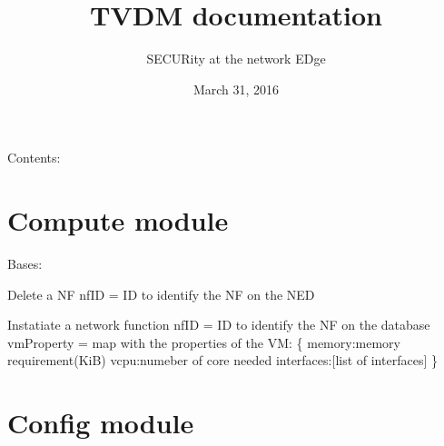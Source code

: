 \documentclass[letterpaper,10pt,oneside]{sphinxmanual}
\title{TVDM documentation}
\date{March 31, 2016}
\author{SECURity at the network EDge}
\begin{document}
\maketitle
\tableofcontents
{}\label{index::doc}


Contents:


\chapter{Compute module}
\label{Compute:welcome-to-tvdm-s-documentation}\label{Compute::doc}\label{Compute:compute-module}\label{Compute:module-Compute}

\begin{fulllineitems}
\label{Compute:Compute.Compute}
Bases: 

\begin{fulllineitems}
\label{Compute:Compute.Compute.deleteNF}
Delete a NF
nfID = ID to identify the NF on the NED

\end{fulllineitems}


\begin{fulllineitems}
\label{Compute:Compute.Compute.instantiateNF}
Instatiate a network function
nfID = ID to identify the NF on the database
vmProperty = map with the properties of the VM:
\{
memory:memory requirement(KiB)
vcpu:numeber of core needed
interfaces:{[}list of interfaces{]}
\}

\end{fulllineitems}


\end{fulllineitems}



\chapter{Config module}
\label{Config:module-Config}\label{Config::doc}\label{Config:config-module}
\end{document}
